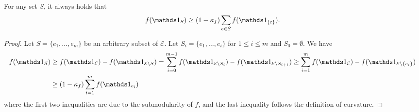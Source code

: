 \begin{lemma}		\label{lem:curvature}
	For any set $S$, it always holds that
	$$
	f(\one_{S}) \geq (1-\kappa_{f}) \sum_{e \in S} f(\one_{\{e\}}).
	$$
\end{lemma}
\begin{proof}
	Let $S = \{e_{1}, \ldots, e_{m}\}$ be an
	arbitrary subset of $\mathcal{E}$. Let $S_{i} = \{e_{1}, \ldots, e_{i}\}$ for $1 \leq i \leq m$ and $S_{0} = \emptyset$.
	We have
	\begin{align*}
	f(\one_{S})
	&\geq  f(\one_{\mathcal{E}}) -  f(\one_{\mathcal{E} \setminus S})
	= \sum_{i=0}^{m-1}  f(\one_{\mathcal{E} \setminus S_{i}}) - f(\one_{\mathcal{E} \setminus S_{i+1}})
	\geq \sum_{i=1}^{m}  f(\one_{\mathcal{E}}) - f(\one_{\mathcal{E} \setminus \{e_{i}\}}) \\
	&\geq (1 - \kappa_{f}) \sum_{i=1}^{m} f(\one_{e_{i}})
	\end{align*}
	where the first two inequalities are due to the submodularity of $f$, and the last inequality follows the definition of curvature.
\end{proof}
